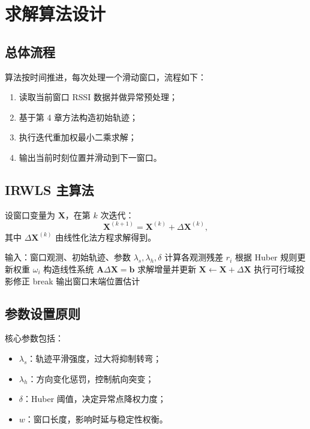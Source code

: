 \chapter{求解算法设计}

\section{总体流程}
算法按时间推进，每次处理一个滑动窗口，流程如下：
\begin{enumerate}
  \item 读取当前窗口 RSSI 数据并做异常预处理；
  \item 基于第 4 章方法构造初始轨迹；
  \item 执行迭代重加权最小二乘求解；
  \item 输出当前时刻位置并滑动到下一窗口。
\end{enumerate}

\section{IRWLS 主算法}
设窗口变量为 $\bm X$，在第 $k$ 次迭代：
\begin{equation}
\bm X^{(k+1)}=\bm X^{(k)}+\Delta\bm X^{(k)},
\end{equation}
其中 $\Delta\bm X^{(k)}$ 由线性化法方程求解得到。

\begin{algorithm}[H]
\caption{滑动窗口鲁棒定位算法}
\begin{algorithmic}[1]
\State 输入：窗口观测、初始轨迹、参数 $\lambda_s,\lambda_h,\delta$
\State 计算各观测残差 $r_i$
\State 根据 Huber 规则更新权重 $\omega_i$
\State 构造线性系统 $\bm A\Delta\bm X=\bm b$
\State 求解增量并更新 $\bm X\leftarrow\bm X+\Delta\bm X$
\State 执行可行域投影修正
\State break
\EndIf
\EndFor
\State 输出窗口末端位置估计
\end{algorithmic}
\end{algorithm}

\section{参数设置原则}
核心参数包括：
\begin{itemize}
  \item $\lambda_s$：轨迹平滑强度，过大将抑制转弯；
  \item $\lambda_h$：方向变化惩罚，控制航向突变；
  \item $\delta$：Huber 阈值，决定异常点降权力度；
  \item $w$：窗口长度，影响时延与稳定性权衡。
\end{itemize}

